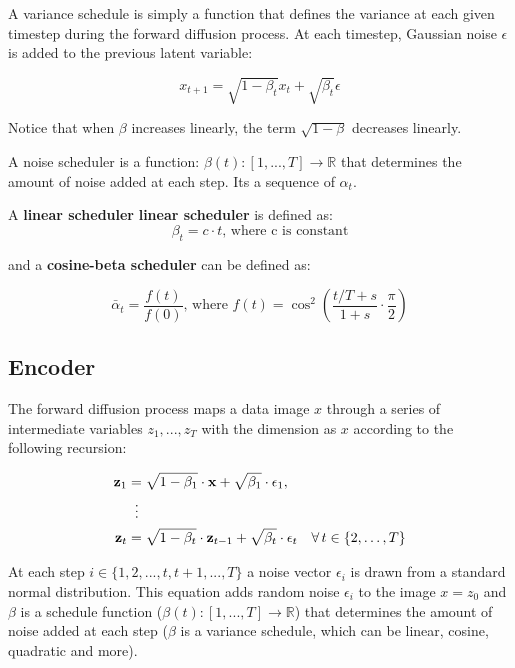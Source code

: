 A variance schedule is simply a function that defines the variance at each given timestep during the forward diffusion process. At each timestep, Gaussian noise $\epsilon$ is added to the previous latent variable:

\[
    x_{t+1} = \sqrt{1 - \beta_t} x_t + \sqrt{\beta_t} \epsilon
\]

Notice that when $\beta$ increases linearly, the term $\sqrt{1-\beta}$ decreases linearly. 

A noise scheduler is a function: $\beta(t):[1, ..., T] \rightarrow \mathbb{R}$ that determines the amount of noise added at each step. Its a sequence of $\alpha_t$.

A \textbf{linear scheduler} \textbf{linear scheduler} is defined as:
\[
    \beta_t = c \cdot t \text{, where c is constant}
\]

and a \textbf{cosine-beta scheduler} can be defined as:

\[
    \bar{\alpha}_t = \frac{f(t)}{f(0)} \text{, where } f(t) = \cos^2 \left( \frac{t/T + s}{1+s} \cdot \frac{\pi}{2} \right)
\]








\subsection{Encoder}

The forward diffusion process maps a data image $x$ through a series of intermediate variables $z_1, ..., z_T$ with the dimension as $x$ according to the following recursion:

\begin{equation}
    \begin{aligned}
    \mathbf{z}_1 &= \sqrt{1 - \beta_1} \cdot \mathbf{x} + \sqrt{\beta_1} \cdot \epsilon_1, \\
    &\;\;\vdots \notag \\
    \mathbf{z}_t &= \sqrt{1 - \beta_t} \cdot \mathbf{z}_{t-1} + \sqrt{\beta_t} \cdot \epsilon_t \quad \forall \, t \in \{2, \ldots, T\}
    \end{aligned}
\end{equation}

At each step $i \in \{1, 2, ..., t, t+1, ..., T\}$ a noise vector $\epsilon_i$ is drawn from a standard normal distribution. This equation adds random noise $\epsilon_i$ to the image $x = z_0$ and $\beta$ is a schedule function ($\beta(t):[1, ..., T] \rightarrow \mathbb{R}$) that determines the amount of noise added at each step ($\beta$ is a variance schedule, which can be linear, cosine, quadratic and more). 

